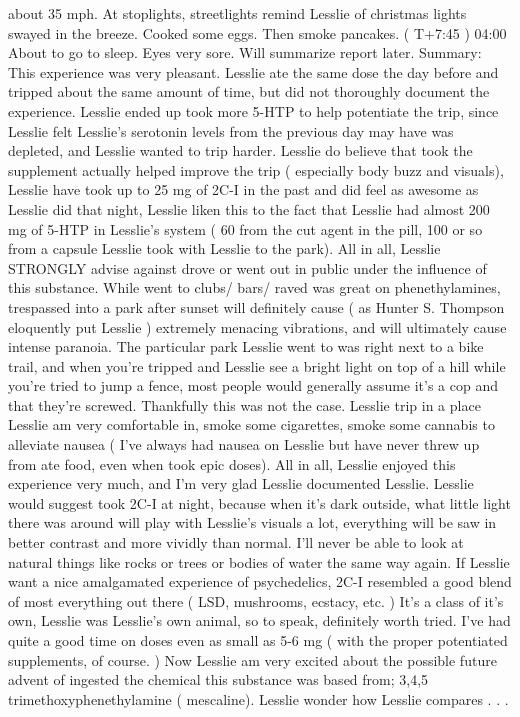 \documentclass[12pt]{book}
\begin{document}
about 35 mph. At stoplights, streetlights remind Lesslie of christmas lights swayed in the breeze. Cooked some eggs. Then smoke pancakes. ( T+7:45 ) 04:00 About to go to sleep. Eyes very sore. Will summarize report later. Summary: This experience was very pleasant. Lesslie ate the same dose the day before and tripped about the same amount of time, but did not thoroughly document the experience. Lesslie ended up took more 5-HTP to help potentiate the trip, since Lesslie felt Lesslie's serotonin levels from the previous day may have was depleted, and Lesslie wanted to trip harder. Lesslie do believe that took the supplement actually helped improve the trip ( especially body buzz and visuals), Lesslie have took up to 25 mg of 2C-I in the past and did feel as awesome as Lesslie did that night, Lesslie liken this to the fact that Lesslie had almost 200 mg of 5-HTP in Lesslie's system ( 60 from the cut agent in the pill, 100 or so from a capsule Lesslie took with Lesslie to the park). All in all, Lesslie STRONGLY advise against drove or went out in public under the influence of this substance. While went to clubs/ bars/ raved was great on phenethylamines, trespassed into a park after sunset will definitely cause ( as Hunter S. Thompson eloquently put Lesslie ) extremely menacing vibrations, and will ultimately cause intense paranoia. The particular park Lesslie went to was right next to a bike trail, and when you're tripped and Lesslie see a bright light on top of a hill while you're tried to jump a fence, most people would generally assume it's a cop and that they're screwed. Thankfully this was not the case. Lesslie trip in a place Lesslie am very comfortable in, smoke some cigarettes, smoke some cannabis to alleviate nausea ( I've always had nausea on Lesslie but have never threw up from ate food, even when took epic doses). All in all, Lesslie enjoyed this experience very much, and I'm very glad Lesslie documented Lesslie. Lesslie would suggest took 2C-I at night, because when it's dark outside, what little light there was around will play with Lesslie's visuals a lot, everything will be saw in better contrast and more vividly than normal. I'll never be able to look at natural things like rocks or trees or bodies of water the same way again. If Lesslie want a nice amalgamated experience of psychedelics, 2C-I resembled a good blend of most everything out there ( LSD, mushrooms, ecstacy, etc. ) It's a class of it's own, Lesslie was Lesslie's own animal, so to speak, definitely worth tried. I've had quite a good time on doses even as small as 5-6 mg ( with the proper potentiated supplements, of course. ) Now Lesslie am very excited about the possible future advent of ingested the chemical this substance was based from; 3,4,5 trimethoxyphenethylamine ( mescaline). Lesslie wonder how Lesslie compares . . . 
\end{document}
